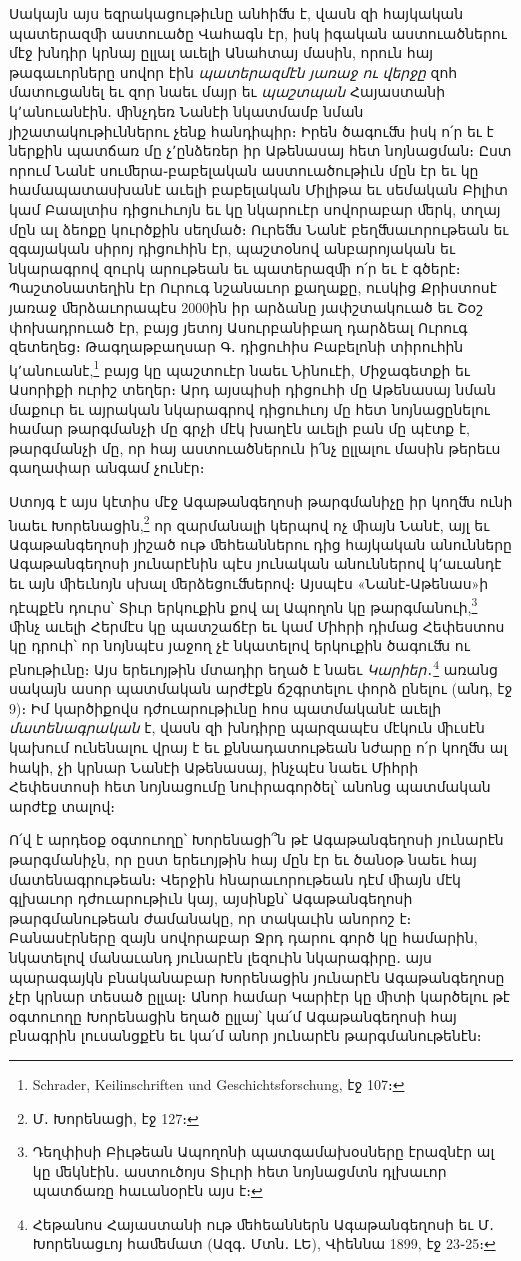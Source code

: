 \documentclass{article}
\begin{document}
{Սակայն այս եզրակացութիւնը անհիﬓ է, վասն զի հայկական պատերազﬕ աստուածը Վահագն էր, իսկ իգական աստուածներու մէջ խնդիր կրնայ ըլլալ աւելի Անահտայ մասին, որուն հայ թագաւորները սովոր էին \emph{պատերազմէն յառաջ ու վերջը} զոհ մատուցանել եւ զոր նաեւ մայր եւ \emph{պաշտպան} Հայաստանի կ՚անուանէին․ ﬕնչդեռ Նանէի նկատմամբ նման յիշատակութիւններու չենք հանդիպիր։ Իրեն ծագուﬓ իսկ ո՛ր եւ է ներքին պատճառ մը չ՚ընձեռեր իր Աթենասայ հետ նոյնացման։ Ըստ որում Նանէ սուﬔրա֊բաբելական աստուածութիւն մըն էր եւ կը համապատասխանէ աւելի բաբելական Միլիթա եւ սեմական Բիլիտ կամ Բաալտիս դիցուհւոյն եւ կը նկարուէր սովորաբար ﬔրկ, տղայ մըն ալ ձեոքը կուրծքին սեղմած։ Ուրեﬓ Նանէ բեղﬓաւորութեան եւ զգայական սիրոյ դիցուհին էր, պաշտօնով անբարոյական եւ նկարագրով զուրկ արութեան եւ պատերազﬕ ո՛ր եւ է գծերէ։ Պաշտօնատեղին էր Ուրուգ նշանաւոր քաղաքը, ուսկից Քրիստոսէ յառաջ ﬔրձաւորապէս 2000ին իր արձանը յափշտակուած եւ Շօշ փոխադրուած էր, բայց յետոյ Ասուրբանիբաղ դարձեալ Ուրուգ զետեղեց։ Թագղաթբաղսար Գ․ դիցուհիս Բաբելոնի տիրուհին կ՚անուանէ,\footnote{Schrader, Keilinschriften und Geschichtsforschung, էջ 107։} բայց կը պաշտուէր նաեւ Նինուէի, Միջագետքի եւ Ասորիքի ուրիշ տեղեր։ Արդ այսպիսի դիցուհի մը Աթենասայ նման մաքուր եւ այրական նկարագրով դիցուհւոյ մը հետ նոյնացընելու համար թարգմանչի մը գրչի մէկ խաղէն աւելի բան մը պէտք է, թարգմանչի մը, որ հայ աստուածներուն ի՛նչ ըլլալու մասին թերեւս գաղափար անգամ չունէր։

Ստոյգ է այս կէտիս մէջ Ագաթանգեղոսի թարգմանիչը իր կողﬓ ունի նաեւ Խորենացին,\footnote{Մ․ Խորենացի, էջ 127։} որ զարմանալի կերպով ոչ ﬕայն Նանէ, այլ եւ Ագաթանգեղոսի յիշած ութ ﬔհեաններու դից հայկական անունները Ագաթանգեղոսի յունարէնին պէս յունական անուններով կ՚աւանդէ եւ այն ﬕեւնոյն սխալ ﬔրձեցուﬓերով։ Այսպէս «Նանէ֊Աթենաս»ի դէպքէն դուրս՝ Տիւր երկուքին քով ալ Ապողոն կը թարգմանուի,\footnote{Դեղփիսի Բիւթեան Ապողոնի պատգամախօսները էրազնէր ալ կը ﬔկնէին․ աստուծոյս Տիւրի հետ նոյնացմտն դլխաւոր պատճառը հաւանօրէն այս է։} ﬕնչ աւելի Հերմէս կը պատշաճէր եւ կամ Միհրի դիմաց Հեփեստոս կը դրուի՝ որ նոյնպէս յաջող չէ նկատելով երկուքին ծագուﬓ ու բնութիւնը։ Այս երեւոյթին մտադիր եղած է նաեւ \emph{Կարիեր}․\footnote{Հեթանոս Հայաստանի ութ ﬔհեաններն Ագաթանգեղոսի եւ Մ․ Խորենացւոյ հաﬔմատ (Ազգ․ Մտն․ ԼԵ), Վիեննա 1899, էջ 23֊25։} առանց սակայն ասոր պատմական արժէքն ճշգրտելու փորձ ընելու (անդ, էջ 9)։ Իմ կարծիքովս դժուարութիւնը հոս պատմականէ աւելի \emph{մատենագրական} է, վասն զի խնդիրը պարզապէս մէկուն ﬕւսէն կախում ունենալու վրայ է եւ քննադատութեան նժարը ո՛ր կողﬓ ալ հակի, չի կրնար Նանէի Աթենասայ, ինչպէս նաեւ Միհրի Հեփեստոսի հետ նոյնացումը նուիրագործել՝ անոնց պատմական արժէք տալով։

Ո՛վ է արդեօք օգտուողը՝ Խորենացի՞ն թէ Ագաթանգեղոսի յունարէն թարգմանիչն, որ ըստ երեւոյթին հայ մըն էր եւ ծանօթ նաեւ հայ մատենագրութեան։ Վերջին հնարաւորութեան դէմ ﬕայն մէկ գլխաւոր դժուարութիւն կայ, այսինքն՝ Ագաթանգեղոսի թարգմանութեան ժամանակը, որ տակաւին անորոշ է։ Բանասէրները զայն սովորաբար Ջրդ դարու գործ կը համարին, նկատելով մանաւանդ յունարէն լեզուին նկարագիրը․ այս պարագայկն բնականաբար Խորենացին յունարէն Ագաթանգեղոսը չէր կրնար տեսած ըլլալ։ Անոր համար Կարիէր կը ﬕտի կարծելու թէ օգտուողը Խորենացին եղած ըլլայ՝ կա՛մ Ագաթանգեղոսի հայ բնագրին լուսանցքէն եւ կա՛մ անոր յունարէն թարգմանութենէն։

}
\end{document}
